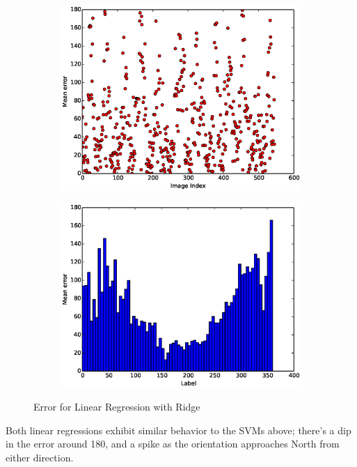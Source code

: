 \documentclass{article}
\begin{document}
\begin{figure}[H]
  \begin{subfigure}[!h]{0.5\textwidth}
    \centering
    \includegraphics[width=\textwidth]{./woodley/Ridge_heading_plot.eps}
  \end{subfigure}
  \begin{subfigure}[!h]{0.5\textwidth}
    \centering
    \includegraphics[width=\textwidth]{./woodley/Ridge_heading_bar.eps}
  \end{subfigure}
  \caption{Error for Linear Regression with Ridge}
\end{figure}

Both linear regressions exhibit similar behavior to the SVMs above; there's a dip in the error around 180\degrees, and a spike as the orientation approaches North from either direction. 
\end{document}
